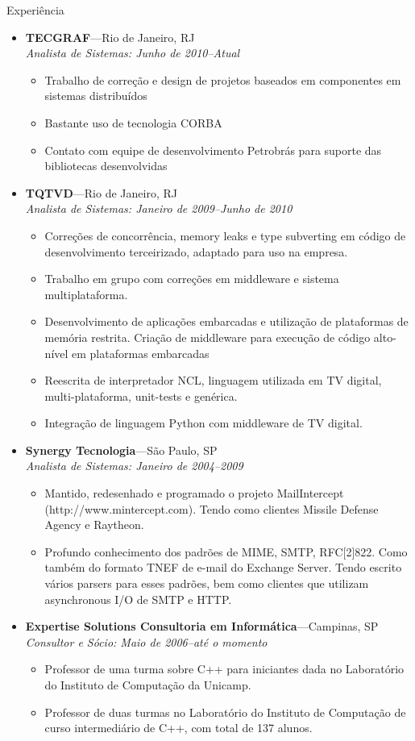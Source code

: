 \documentclass[10pt,oneside]{article}
\newenvironment{ressection}[1]{
	\vspace{4pt}
	{\fontfamily{phv}\selectfont\Large#1}
	\begin{itemize}
	\vspace{3pt}
}{
	\end{itemize}
}
\newcommand{\ressubitem}[1]{
	\vspace{-1pt}
	\item \begin{flushleft} #1 \end{flushleft}
}
\newcommand{\resbigitem}[3]{
	\vspace{-5pt}
	\item
	\textbf{#1}---#2 \\
	\textit{#3}
}
\newenvironment{ressubsec}[3]{
	\resbigitem{#1}{#2}{#3}
	\vspace{-2pt}
	\begin{itemize}
}{
	\end{itemize}
}
\begin{document}
\begin{ressection}{Experi\^encia}

  \begin{ressubsec}{TECGRAF}{Rio de Janeiro, RJ}{Analista de Sistemas: Junho de 2010--Atual}
    \ressubitem{Trabalho de correção e design de projetos baseados em componentes em sistemas distribuídos}
    \ressubitem{Bastante uso de tecnologia CORBA}
    \ressubitem{Contato com equipe de desenvolvimento Petrobrás para suporte das bibliotecas desenvolvidas}
  \end{ressubsec}

	\begin{ressubsec}{TQTVD}{Rio de Janeiro, RJ}{Analista de Sistemas: Janeiro de 2009--Junho de 2010}
      \ressubitem{Correções de concorrência, memory leaks e type subverting em código de desenvolvimento
        terceirizado, adaptado para uso na empresa.}
      \ressubitem{Trabalho em grupo com correções em middleware e sistema multiplataforma.}
      \ressubitem{Desenvolvimento de aplicações embarcadas e utilização de plataformas de memória restrita.
        Criação de middleware para execução de código alto-nível em plataformas embarcadas}
      \ressubitem{Reescrita de interpretador NCL, linguagem utilizada em TV digital, multi-plataforma,
        unit-tests e genérica.}
      \ressubitem{Integração de linguagem Python com middleware de TV digital.}
	\end{ressubsec}

	\begin{ressubsec}{Synergy Tecnologia}{S\~ao Paulo, SP}{Analista de Sistemas: Janeiro de 2004--2009}
		\ressubitem{Mantido, redesenhado e programado o projeto MailIntercept (http://www.mintercept.com). Tendo como clientes Missile Defense Agency e Raytheon.}
		\ressubitem{Profundo conhecimento dos padr\~oes de MIME, SMTP, RFC[2]822. Como tamb\'em do formato TNEF de e-mail do Exchange Server.
		  Tendo escrito v\'arios parsers para esses padr\~oes, bem como clientes que utilizam asynchronous I/O de SMTP e HTTP.}
	\end{ressubsec}

	\begin{ressubsec}{Expertise Solutions Consultoria em Inform\'atica}{Campinas, SP}{Consultor e Sócio: Maio de 2006--at\'e o momento}
		\ressubitem{Professor de uma turma sobre C++ para iniciantes dada no Laborat\'orio do Instituto de
		Computa\c{c}\~ao da Unicamp.}
		\ressubitem{Professor de duas turmas no Laboratório do Instituto de Computa\c{c}\~ao de curso intermediário de C++, com total de 137 alunos.}
	\end{ressubsec}


\end{ressection}
\end{document}
